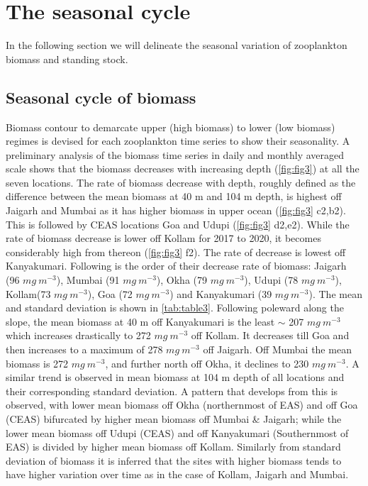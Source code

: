 \documentclass{article}
\begin{document}
	 
	 
	 
	\section{The seasonal cycle}
	In the following section we will delineate the seasonal variation of zooplankton biomass and standing stock.
	\subsection{Seasonal cycle of biomass}
	\label{sec:seasonalcyclebiomass}
	Biomass contour to demarcate upper (high biomass) to lower (low biomass) regimes is devised for each zooplankton time series to show their seasonality. A preliminary analysis of the biomass time series in daily and monthly averaged scale shows that the biomass decreases with increasing depth (\cref{fig:fig3}) at all the seven locations. The rate of biomass decrease with depth, roughly defined as the difference between the mean biomass at 40 m  and 104 m depth, is highest off Jaigarh and Mumbai as it has higher biomass in upper ocean (\cref{fig:fig3} c2,b2). This is followed by CEAS locations Goa and Udupi (\cref{fig:fig3} d2,e2). While the rate of biomass decrease is lower off Kollam for 2017 to 2020, it becomes considerably high from thereon (\cref{fig:fig3} f2). The rate of decrease is lowest off Kanyakumari. Following is the order of their decrease rate of biomass: Jaigarh (96 $mg\ m^{-3}$), Mumbai (91 $mg\ m^{-3}$), Okha (79 $mg\ m^{-3}$), Udupi (78 $mg\ m^{-3}$), Kollam(73 $mg\ m^{-3}$), Goa (72 $mg\ m^{-3}$) and Kanyakumari (39 $mg\ m^{-3}$).  The mean and standard deviation is shown in \autoref{tab:table3}. Following poleward along the slope, the mean biomass at 40 m off Kanyakumari is the least $\sim$ 207 $mg\ m^{-3}$ which increases drastically to 272 $mg\ m^{-3}$ off Kollam. It decreases till Goa and then increases to a maximum of 278 $mg\ m^{-3}$ off Jaigarh. Off Mumbai the mean biomass is 272 $mg\ m^{-3}$, and further north off Okha, it declines to 230 $mg\ m^{-3}$. A similar trend is observed in mean biomass at 104 m depth of all locations and their corresponding standard deviation. A pattern that develops from this is observed, with lower mean biomass off Okha (northernmost of EAS) and off Goa (CEAS) bifurcated by higher mean biomass off Mumbai \& Jaigarh; while the lower mean biomass off Udupi (CEAS) and off Kanyakumari (Southernmost of EAS) is divided by higher mean biomass off Kollam. Similarly from standard deviation of biomass it is inferred that the sites with higher biomass tends to have higher variation over time as in the case of Kollam, Jaigarh and Mumbai. 
	
\end{document}
